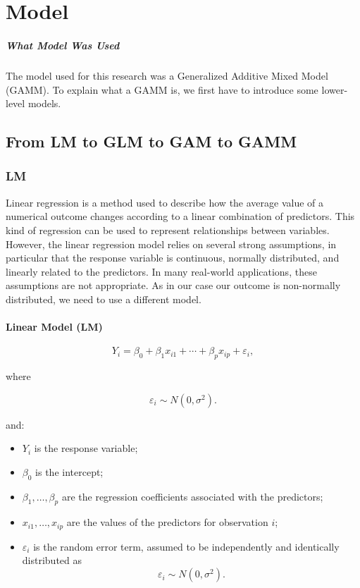\chapter{Model}
\paragraph{What Model Was Used}
The model used for this research was a Generalized Additive Mixed Model (GAMM).
To explain what a GAMM is, we first have to introduce some lower-level models.\\
\section{From LM to GLM to GAM to GAMM}
\subsection{LM}
Linear regression is a method used to describe how the average 
value of a numerical outcome changes according to a linear 
combination of predictors.
This kind of regression can be used to represent relationships 
between variables.
However, the linear regression model relies on several strong assumptions, 
in particular that the response variable is continuous, 
normally distributed, and linearly related to the predictors. 
In many real-world applications, these assumptions are not appropriate. 
As in our case our outcome is non-normally distributed, we need
to use a different model.
\subsubsection{Linear Model (LM)}
\begin{equation}
Y_i = \beta_0 + \beta_1x_{i1} + \cdots + \beta_px_{ip} + \varepsilon_i,
\end{equation}

where

\begin{equation}
\varepsilon_i \sim N(0,\sigma^2).
\end{equation}

and:
\begin{itemize}
    \item $Y_i$ is the response variable;
    \item $\beta_0$ is the intercept;
    \item $\beta_1,\ldots,\beta_p$ are the regression coefficients associated with the predictors;
    \item $x_{i1},\ldots,x_{ip}$ are the values of the predictors for observation $i$;
    \item $\varepsilon_i$ is the random error term, assumed to be independently and identically distributed as
    \[
    \varepsilon_i \sim N(0,\sigma^2).
    \]
\end{itemize}

